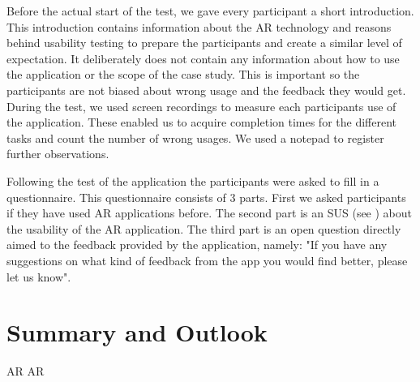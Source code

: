 \documentclass[11pt, a4paper]{article}
\begin{document}
			Before the actual start of the test, we gave every participant a short introduction. This introduction contains information about the \ac{AR} technology and reasons behind usability testing to prepare the participants and create a similar level of expectation. It deliberately does not contain any information about how to use the application or the scope of the case study. This is important so the participants are not biased about wrong usage and the feedback they would get. During the test, we used screen recordings to measure each participants use of the application. These enabled us to acquire completion times for the different tasks and count the number of wrong usages. We used a notepad to register further observations.

			Following the test of the application the participants were asked to fill in a questionnaire. This questionnaire consists of 3 parts. First we asked participants if they have used \ac{AR} applications before. The second part is an \ac{SUS} (see ) about the usability of the \ac{AR} application. The third part is an open question directly aimed to the feedback provided by the application, namely: "If you have any suggestions on what kind of feedback from the app you would find better, please let us know".

	\section*{Summary and Outlook}\label{sec:summary}
		\cite{Dey2016} \cite{Nilsson2007} \cite{Poupyrev2002} \ac{AR} \ac{AR}

	\pagebreak
	\printbibliography
\restoregeometry
\end{document}
